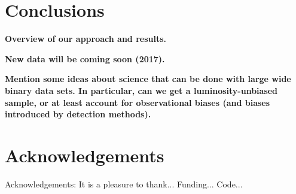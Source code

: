 \documentclass[usenatbib]{mnras}
\begin{document}
\section{Conclusions}

{\bf Overview of our approach and results.}

{\bf New data will be coming soon (2017).}

{\bf Mention some ideas about science that can be done with large wide binary data sets. In particular, can we get a luminosity-unbiased sample, or at least account for observational biases (and biases introduced by detection methods).}


\section*{Acknowledgements}
Acknowledgements:
It is a pleasure to thank...
Funding...
Code...





\label{lastpage}
\end{document}
